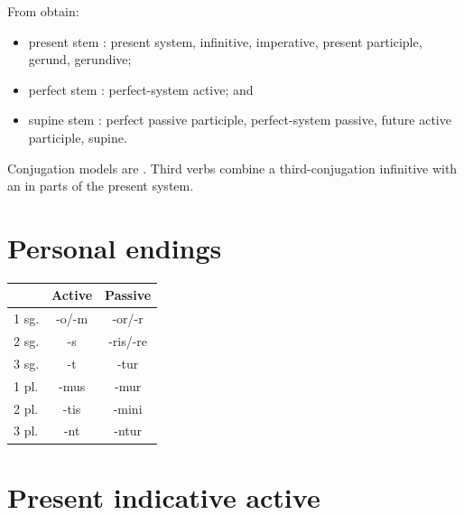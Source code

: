 
From  obtain:

\begin{itemize}
  \item present stem : present system, infinitive, imperative,
        present participle, gerund, gerundive;
  \item perfect stem : perfect-system active; and
  \item supine stem : perfect passive participle, perfect-system
        passive, future active participle, supine.
\end{itemize}

Conjugation models are . Third
 verbs combine a third-conjugation infinitive with an 
in parts of the present system.

\section{Personal endings}


\begin{center}
\begin{tabular}{@{}lcc@{}}
  \toprule & \textbf{Active} & \textbf{Passive} \\
  \midrule
  1 sg. & -o/-m & -or/-r \\
  2 sg. & -s & -ris/-re \\
  3 sg. & -t & -tur \\
  1 pl. & -mus & -mur \\
  2 pl. & -tis & -mini \\
  3 pl. & -nt & -ntur \\
  \bottomrule
\end{tabular}
\end{center}

\section{Present indicative active}

